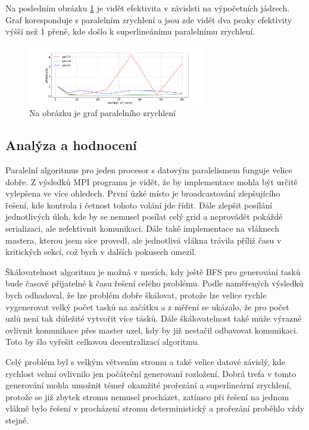 \documentclass[]{article}
\begin{document}
Na posledním obrázku \ref{a:eempi3} je vidět efektivita v závislsti na výpočetních jádrech. Graf koresponduje s paralelním zrychlení a jsou zde vidět dva peaky efektivity výšší než 1 přeně, kde došlo k superlineánímu paralelnímu zrychlení.
 \begin{figure}[H]\centering
	\includegraphics[width=0.7\textwidth]{img/parralelEfectivitympi3}
 	\caption{Na obrázku je graf paralelního zrychlení}\label{a:eempi3}
 \end{figure}

\subsection{Analýza a hodnocení}

Paralelní algoritmus pro jeden procesor s datovým paralelismem funguje velice dobře. Z výsledků MPI programu je vidět, že by implementace mohla být určitě vylepšena ve více ohledech. První úzké místo je broadcastování zlepšujícího řešení, kde kontrola i četnost tohoto volání jde řídit. Dále zlepšit posílání jednotlivých úloh, kde by se nemusel posílat celý grid a neprovádět pokáždé serializaci, ale zefektivnit komunikaci. Dále také implementace na vláknech mastera, kterou jsem sice provedl, ale jednotlivá vlákna trávila příliž času v kritických sekcí, což bych v dalších pokusech omezil. 

Škálovatelnost algoritmu je možná v mezích, kdy ještě BFS pro generování tasků bude časově přijatelné k času řešení celého problému. Podle naměřených výsledků bych odhadoval, že lze problém dobře škálovat, protože lze velice rychle vygenerovat velký počet tasků na začátku a z měření se ukázalo, že pro počet uzlů není tak důležité vytvořit více tásků. Dále škálovatelnost také může výrazně ovlivnit komunikace přes master uzel, kdy by již nestačil odbavovat komunikaci. Toto by šlo vyřešit celkovou decentralizací algoritmu.

Celý problém byl s velkým větvením stromu a také velice datové závislý, kde rychlost velmi ovlivnilo jen počáteční generovaní rozložení. Dobrá trefa v tomto generování mohla umožnit témeř okamžité prořezání a superlineární zrychlení, protože se již zbytek stromu nemusel procházet, zatímco při řešení na jednom vlákně bylo řešení v procházení stromu deterministický a prořezání proběhlo vždy stejně.
\end{document}
